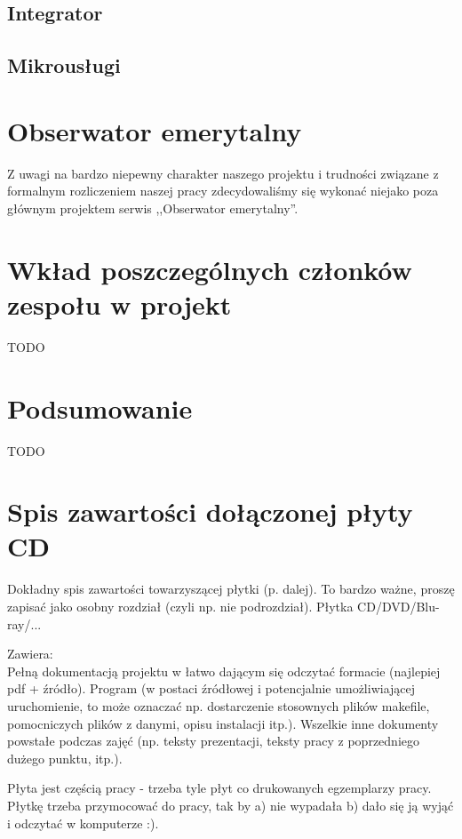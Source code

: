 \documentclass[licencjacka]{pracamgr}
\begin{document}
\section{Integrator}

\section{Mikrousługi}

\chapter{Obserwator emerytalny}
Z uwagi na bardzo niepewny charakter naszego projektu i trudności związane z
formalnym rozliczeniem naszej pracy zdecydowaliśmy się wykonać niejako poza
głównym projektem serwis ,,Obserwator emerytalny''.

\chapter{Wkład poszczególnych członków zespołu w projekt}\label{r:wklad}
TODO

\chapter{Podsumowanie}
TODO

\appendix
\chapter{Spis zawartości dołączonej płyty CD}\label{r:spis}
Dokładny spis zawartości towarzyszącej płytki (p. dalej). To bardzo ważne, proszę zapisać jako osobny rozdział (czyli np. nie podrozdział). Płytka CD/DVD/Blu-ray/...

Zawiera:\\
Pełną dokumentacją projektu w łatwo dającym się odczytać formacie (najlepiej pdf + źródło).
Program (w postaci źródłowej i potencjalnie umożliwiającej uruchomienie, to może oznaczać np. dostarczenie stosownych plików makefile, pomocniczych plików z danymi, opisu instalacji itp.).
Wszelkie inne dokumenty powstałe podczas zajęć (np. teksty prezentacji, teksty pracy z poprzedniego dużego punktu, itp.).

Płyta jest częścią pracy - trzeba tyle płyt co drukowanych egzemplarzy pracy. Płytkę trzeba przymocować do pracy, tak by a) nie wypadała b) dało się ją wyjąć i odczytać w komputerze :).
\end{document}
